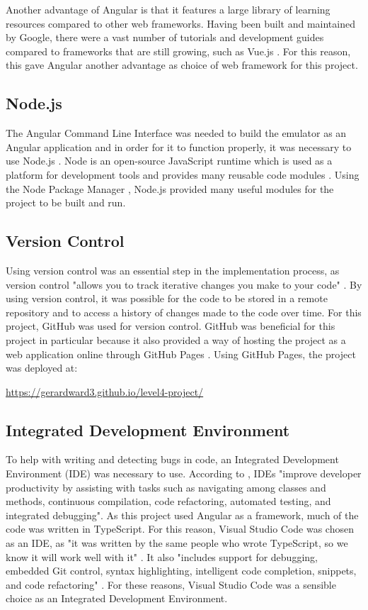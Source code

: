 \documentclass{l4proj}
\begin{document}
Another advantage of Angular is that it features a large library of learning resources compared to other web frameworks. Having been built and maintained by Google, there were a vast number of tutorials and development guides compared to frameworks that are still growing, such as Vue.js \citep{vue19}. For this reason, this gave Angular another advantage as choice of web framework for this project.

\subsection{Node.js}
The Angular Command Line Interface was needed to build the emulator as an Angular application and in order for it to function properly, it was necessary to use Node.js \citep{node19}. Node is an open-source JavaScript runtime which is used as a platform for development tools and provides many reusable code modules \citep{ClowNode18}. Using the Node Package Manager \citep{npm19}, Node.js provided many useful modules for the project to be built and run.

\subsection{Version Control}
Using version control was an essential step in the implementation process, as version control "allows you to track iterative changes you make to your code" \citep{vcs16}. By using version control, it was possible for the code to be stored in a remote repository and to access a history of changes made to the code over time. For this project, GitHub \citep{github19} was used for version control. GitHub was beneficial for this project in particular because it also provided a way of hosting the project as a web application online through GitHub Pages \citep{githubpages19}. Using GitHub Pages, the project was deployed at:

 \url{https://gerardward3.github.io/level4-project/}
 
\subsection{Integrated Development Environment}
To help with writing and detecting bugs in code, an Integrated Development Environment (IDE) was necessary to use. According to \citet{ide15}, IDEs "improve developer productivity by assisting with tasks such as navigating among classes and methods, continuous compilation, code refactoring, automated testing, and integrated debugging". As this project used Angular as a framework, much of the code was written in TypeScript. For this reason, Visual Studio Code was chosen as an IDE, as "it was written by the same people who wrote TypeScript, so we know it will work well with it" \citep{visualstudio18}. It also "includes support for debugging, embedded Git control, syntax highlighting, intelligent code completion, snippets, and code refactoring" \citep{visualstudio18}. For these reasons, Visual Studio Code was a sensible choice as an Integrated Development Environment.
\end{document}
